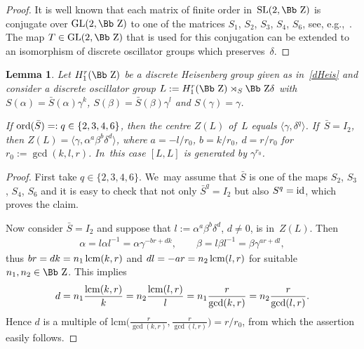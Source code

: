 \documentclass[pdftex]{sigma}
\newcommand\ZZ{{\mbox{\Bb Z}}}
\newcommand{\GL}{\mathop{{\rm GL}}}
\newcommand{\SL}{\mathop{{\rm SL}}}
\newcommand{\Id}{\mathop{{\rm id}}}
\newcommand{\lcm}{\mathop{{\rm lcm}}}
\newcommand{\ord}{{\rm ord}}
\newcommand\la{\langle}
\newcommand\ra{\rangle}
\numberwithin{equation}{section}
\newtheorem{Lemma}[Theorem]{Lemma}
\begin{document}
\begin{proof}
It is well known that each matrix of finite order in~$\SL(2,\ZZ)$ is conjugate over $\GL(2,\ZZ)$ to one of the matrices $S_1$, $S_2$, $S_3$, $S_4$, $S_6$, see, e.g.,~\cite{N}. The map $T\in\GL(2,\ZZ)$ that is used for this conjugation can be extended to an isomorphism of discrete oscillator groups which preserves~$\delta$.
\end{proof}
%
\begin{Lemma}
Let $H_1^r(\ZZ)$ be a discrete Heisenberg group given as in~\eqref{dHeis} and consider a discrete oscillator group $L:=H_1^r(\ZZ)\rtimes_S \ZZ \delta$ with $S(\alpha)=\bar S(\alpha)\gamma^k$, $S(\beta)=\bar S(\beta)\gamma^l$ and $S(\gamma)=\gamma$.

If $\ord(\bar S)=:q\in\{2,3,4,6\}$, then the centre $Z(L)$ of~$L$ equals $\la \gamma, \delta^q\ra$. If~$\bar S=I_2$, then $Z(L)=\la \gamma, \alpha^a\beta^b\delta^d\ra$,
where $a=-l/r_0$, $b=k/r_0$, $d=r/r_0$ for $r_0:=\gcd(k,l,r)$. In~this case $[L,L]$ is generated by $\gamma^{r_0}$.
\end{Lemma}

\begin{proof}
First take $q\in\{2,3,4,6\}$. We~may assume that $\bar S$ is one of the maps $S_2$, $S_3$, $S_4$, $S_6$ and it is easy to check that not only $\bar S^q=I_2$ but also $S^q=\Id$, which proves the claim.

Now consider $\bar S=I_2$ and suppose that $l:=\alpha^a\beta^b\delta^d$, $d\not=0$, is in~$Z(L)$. Then
\begin{gather*}
\alpha=l\alpha l^{-1}=\alpha \gamma^{-br+dk}, \qquad
\beta=l\beta l^{-1}=\beta\gamma^{ar+dl},
\end{gather*}
thus $br=dk=n_1 \lcm(k,r)$ and $dl=-ar=n_2 \lcm(l,r)$ for suitable $n_1,n_2\in\ZZ$. This implies
\begin{gather*}
d= n_1\frac{\lcm(k,r)}k=n_2\frac{\lcm(l,r)}l
 = n_1 \frac r{\gcd(k,r)}= n_2\frac r{\gcd(l,r)}.
\end{gather*}
Hence $d$ is a multiple of lcm$\big( \frac r{\gcd(k,r)},\frac r{\gcd(l,r)}\big)=r/{r_0}$, from which the assertion easily follows.
\end{proof}
\end{document}
